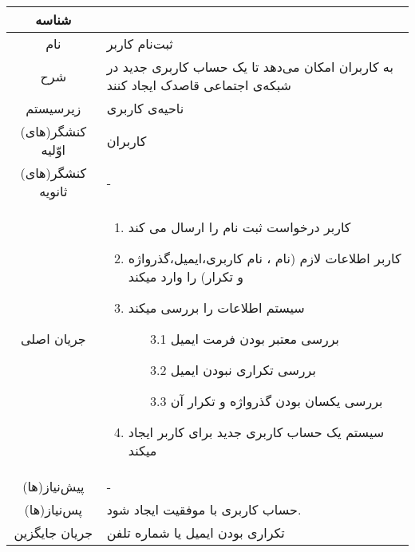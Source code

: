             \setcounter{usecaseid}{0}

            \newcommand{\usecase}[9]{
                \stepcounter{usecaseid}
                \begin{table}
                    \centering
                    \begin{tabular}{|c|p{7cm}|}
                        \hline
                        شناسه & \arabic{usecaseid}\\\hline
                        نام & #1\\\hline
                        شرح & #2\\\hline
                        زیرسیستم & #3\\\hline
                        کنشگر(های) اوّلیه & #4\\\hline
                        کنشگر(های) ثانویه & #5\\\hline
                        جریان اصلی & #6\\\hline
                        پیش‌نیاز(ها) & #7\\\hline
                        پس‌نیاز(ها) & #8\\\hline
                        جریان جایگزین & #9\\\hline
    
                    \end{tabular}
                \end{table}
            }
            \usecase{ثبت‌نام کاربر}{
                    به کاربران امکان می‌دهد تا یک حساب کاربری جدید در شبکه‌ی اجتماعی قاصدک ایجاد کنند
                }{ناحیه‌ی کاربری}{کاربران}{-}{
                    \begin{enumerate}
                        \item کاربر درخواست ثبت نام را ارسال می کند
                        \item کاربر اطلاعات لازم (نام ، نام کاربری،ایمیل،گذرواژه و تکرار)  را وارد میکند
                        \item سیستم اطلاعات را بررسی میکند
                            \begin{itemize}
                                \item[3.1] بررسی معتبر بودن فرمت ایمیل
                                \item[3.2] بررسی تکراری نبودن ایمیل
                                \item[3.3] بررسی یکسان بودن گذرواژه و تکرار آن
                            \end{itemize}
                        \item سیستم یک حساب کاربری جدید برای کاربر ایجاد میکند
                    \end{enumerate}
                }{-}{حساب کاربری با موفقیت ایجاد شود.}{تکراری بودن ایمیل یا شماره تلفن}

